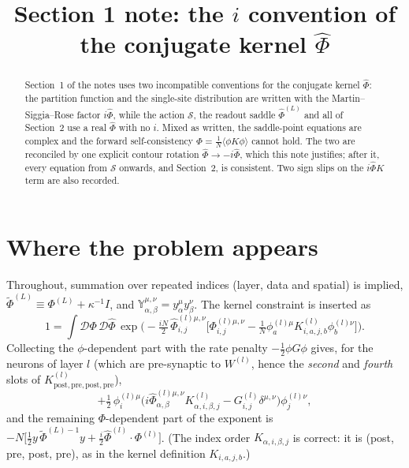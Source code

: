 \documentclass[11pt,a4paper]{article}
\title{Section 1 note: the $i$ convention of the conjugate kernel $\hat\Phi$}
\author{}
\date{}
\newcommand{\D}{\mathcal D}
\newcommand{\Sact}{\mathcal S}
\newcommand{\Phit}{\tilde\Phi}
\begin{document}
\maketitle

\begin{abstract}
Section~1 of the notes uses two incompatible conventions for the conjugate
kernel $\hat\Phi$: the partition function and the single-site distribution are
written with the Martin--Siggia--Rose factor $i\hat\Phi$, while the action
$\Sact$, the readout saddle $\hat\Phi^{(L)}$ and all of Section~2 use a real
$\hat\Phi$ with no $i$. Mixed as written, the saddle-point equations are complex
and the forward self-consistency $\Phi = \frac1N\langle\phi K\phi\rangle$ cannot
hold. The two are reconciled by one explicit contour rotation
$\hat\Phi\to -i\hat\Phi$, which this note justifies; after it, every equation
from $\Sact$ onwards, and Section~2, is consistent. Two sign slips on the
$i\hat\Phi K$ term are also recorded.
\end{abstract}

\section{Where the problem appears}

Throughout, summation over repeated indices (layer, data and spatial) is
implied, $\Phit^{(L)} \equiv \Phi^{(L)} + \kappa^{-1} I$, and
$\mathbb Y^{\mu,\nu}_{\alpha,\beta} = y^\mu_\alpha y^\nu_\beta$.
The kernel constraint is inserted as
\begin{equation}
  1 = \int \D\Phi\,\D\hat\Phi\,
  \exp\Big(-\tfrac{iN}{2}\,\hat\Phi^{(l)\mu,\nu}_{i,j}
  \Big[\Phi^{(l)\mu,\nu}_{i,j} - \tfrac1N\phi^{(l)\mu}_a K^{(l)}_{i,a,j,b}\phi^{(l)\nu}_b\Big]\Big).
  \label{eq:unity}
\end{equation}
Collecting the $\phi$-dependent part with the rate penalty
$-\frac12\phi G\phi$ gives, for the neurons of layer $l$ (which are pre-synaptic
to $W^{(l)}$, hence the \emph{second} and \emph{fourth} slots of
$K^{(l)}_{\text{post},\text{pre},\text{post},\text{pre}}$),
\begin{equation}
  +\tfrac12\,\phi^{(l)\mu}_i\Big(i\hat\Phi^{(l)\mu,\nu}_{\alpha,\beta}K^{(l)}_{\alpha,i,\beta,j}
  - G^{(l)}_{i,j}\delta^{\mu,\nu}\Big)\phi^{(l)\nu}_j ,
  \label{eq:tilt-msr}
\end{equation}
and the remaining $\Phi$-dependent part of the exponent is
$-N\big[\frac12 y\,\Phit^{(L)-1}y + \frac i2 \hat\Phi^{(l)}\!\cdot\Phi^{(l)}\big]$.
(The index order $K_{\alpha,i,\beta,j}$ is correct: it is (post, pre, post, pre),
as in the kernel definition $K_{i,a,j,b}$.)
\end{document}
